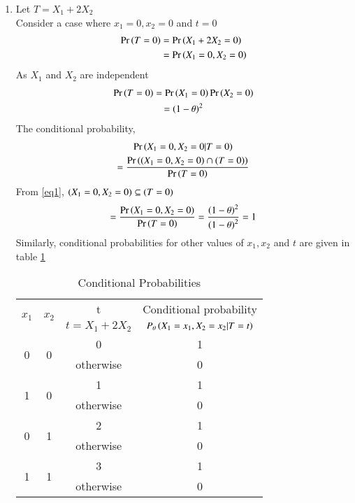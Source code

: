 \documentclass[journal,12pt,twocolumn]{IEEEtran}
\begin{document}
\begin{enumerate}
    \item Let $T=X_1+2X_2$\\
    Consider a case where $x_1=0, x_2=0$ and $t=0$
    \begin{align}
    \Pr\left(T=0\right)&=\Pr\left(X_1+2X_2=0\right)\\
    \label{eq1}&=\Pr\left(X_1=0,X_2=0\right)
    \end{align}
    As $X_1$ and $X_2$ are independent
    \begin{multline}
        \Pr\left(T=0\right)=\Pr\left(X_1=0\right)\Pr\left(X_2=0\right)\\
        =\left(1-\theta\right)^2
    \end{multline}
   The conditional probability,
    \begin{multline}
        \Pr\left(X_1=0,X_2=0 | T=0\right)\\
        =\frac{\Pr\left(\left(X_1=0,X_2=0\right)\cap\left(T=0\right)\right)}{\Pr\left(T=0\right)}
    \end{multline}
    From \eqref{eq1}, $\left(X_1=0,X_2=0\right) \subseteq \left(T=0\right)$
    \begin{multline}
        =\frac{\Pr\left(X_1=0,X_2=0\right)}{\Pr\left(T=0\right)}=\frac{\left(1-\theta\right)^2}{\left(1-\theta\right)^2}=1
    \end{multline}
    Similarly, conditional probabilities for other values of $x_1,x_2$ and $t$ are given in table \ref{table1}
    \begin{table}[h!]
    \begin{tabular}[width=\columnwidth]{|c|c|c|c|}
         \hline
        \multirow{2}{*}{$x_1$} & \multirow{2}{*}{$x_2$} & t & Conditional probability\\
        & & $t=X_1+2X_2$ & $P_\theta\left(X_1=x_1,X_2=x_2|T=t\right)$\\
        \hline
        \multirow{2}{*}{0} & \multirow{2}{*}{0} & 0 & 1\\ 
        & & otherwise & 0 \\ 
        \hline
        \multirow{2}{*}{1} & \multirow{2}{*}{0} & 1 & 1\\ 
        & & otherwise & 0 \\ 
        \hline
        \multirow{2}{*}{0} & \multirow{2}{*}{1} & 2 & 1\\ 
        & & otherwise & 0 \\ 
        \hline
        \multirow{2}{*}{1} & \multirow{2}{*}{1} & 3 & 1\\ 
        & & otherwise & 0 \\        
        \hline
    \end{tabular}
    \caption{Conditional Probabilities}
    \label{table1}
    \end{table}    
    

\end{enumerate}
\end{document}
